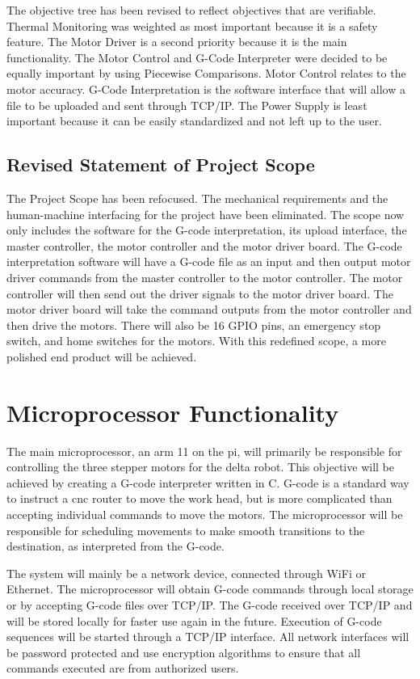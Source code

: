 The objective tree has been revised to reflect objectives that are verifiable.
Thermal Monitoring was weighted as most important because it is a safety feature.
The Motor Driver is a second priority because it is the main functionality.
The Motor Control and G-Code Interpreter were decided to be equally important by using Piecewise Comparisons.
Motor Control relates to the motor accuracy.
G-Code Interpretation is the software interface that will allow a file to be uploaded and sent through TCP/IP.
The Power Supply is least important because it can be easily standardized and not left up to the user.
\subsection{Revised Statement of Project Scope}
The Project Scope has been refocused. 
The mechanical requirements and the human-machine interfacing for the project have been eliminated.
The scope now only includes the software for the G-code interpretation, its upload interface, the master controller, the motor controller and the motor driver board.
The G-code interpretation software will have a G-code file as an input and then output motor driver commands from the master controller to the motor controller.
The motor controller will then send out the driver signals to the motor driver board. 
The motor driver board will take the command outputs from the motor controller and then drive the motors. 
There will also be 16 GPIO pins, an emergency stop switch, and home switches for the motors. 
With this redefined scope, a more polished end product will be achieved. 
\section{Microprocessor Functionality}
The main microprocessor, an \gls{arm} 11 on the \gls{pi}, will primarily be responsible for controlling the three stepper motors for the delta robot.
This objective will be achieved by creating a G-code interpreter written in C.
G-code is a standard way to instruct a \gls{cnc} router to move the work head, but is more complicated than accepting individual commands to move the motors.
The microprocessor will be responsible for scheduling movements to make smooth transitions to the destination, as interpreted from the G-code.

The system will mainly be a network device, connected through WiFi or Ethernet.
The microprocessor will obtain G-code commands through local storage or by accepting G-code files over TCP/IP.
The G-code received over TCP/IP and will be stored locally for faster use again in the future.
Execution of G-code sequences will be started through a TCP/IP interface.
All network interfaces will be password protected and use encryption algorithms to ensure that all commands executed are from authorized users. 

